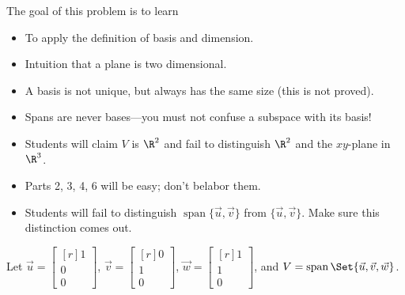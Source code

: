 \documentclass{problemset}
\DeclareMathOperator{\Span}{span}
\newcommand{\mat}[1]{\begin{bmatrix*}[r]#1\end{bmatrix*}}
\begin{document}
	\question
	\begin{annotation}
		\begin{goals}

			The goal of this problem is to learn
			\begin{itemize}
				\item To apply the definition of basis and dimension.
				\item Intuition that a plane is two dimensional.
				\item A basis is not unique, but always has the same size (this is not proved).
				\item Spans are never bases---you must not confuse a subspace with its basis!
			\end{itemize}
		\end{goals}

		\begin{notes}
			\begin{itemize}
				\item Students will claim $V$ is $\R^2$ and fail to distinguish 
					$\R^2$ and the $xy$-plane in $\R^3$.
				\item Parts 2, 3, 4, 6 will be easy; don't belabor them.
				\item Students will fail to distinguish $\Span\{\vec u,\vec v\}$ 
					from $\{\vec u,\vec v\}$. Make sure this distinction comes out.
			\end{itemize}
		\end{notes}
	\end{annotation}
	Let $\vec u=\mat{1\\0\\0}$, $\vec v=\mat{0\\1\\0}$, $\vec w=\mat{1\\1\\0}$, 
	and $V=\Span\Set{\vec u,\vec v,\vec w}$.
\end{document}
